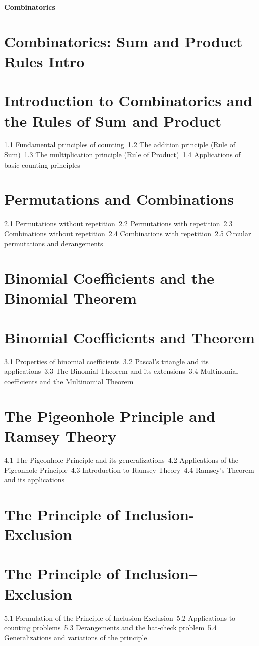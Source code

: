 {\LARGE \bf{Combinatorics}}
\section{Combinatorics: Sum and Product Rules Intro}
\section{Introduction to Combinatorics and the Rules of Sum and Product}
1.1 Fundamental principles of counting\
1.2 The addition principle (Rule of Sum)\
1.3 The multiplication principle (Rule of Product)\
1.4 Applications of basic counting principles\
\section{Permutations and Combinations}
2.1 Permutations without repetition\
2.2 Permutations with repetition\
2.3 Combinations without repetition\
2.4 Combinations with repetition\
2.5 Circular permutations and derangements\
\section{Binomial Coefficients and the Binomial Theorem}
\section{Binomial Coefficients and Theorem}
3.1 Properties of binomial coefficients\
3.2 Pascal's triangle and its applications\
3.3 The Binomial Theorem and its extensions\
3.4 Multinomial coefficients and the Multinomial Theorem\
\section{The Pigeonhole Principle and Ramsey Theory}
4.1 The Pigeonhole Principle and its generalizations\
4.2 Applications of the Pigeonhole Principle\
4.3 Introduction to Ramsey Theory\
4.4 Ramsey's Theorem and its applications\
\section{The Principle of Inclusion-Exclusion}
\section{The Principle of Inclusion–Exclusion}
5.1 Formulation of the Principle of Inclusion-Exclusion\
5.2 Applications to counting problems\
5.3 Derangements and the hat-check problem\
5.4 Generalizations and variations of the principle\
